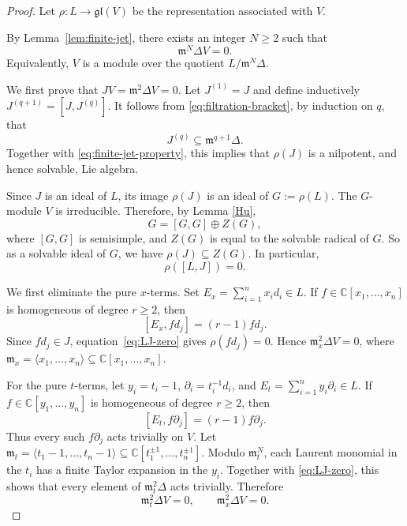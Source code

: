 \documentclass[10pt,a4paper]{amsart}
\newcommand{\C}{\mathbb C}
\def\mm{\mathfrak{m}}
\begin{document}
\begin{proof}
Let
\(
\rho\colon L\rightarrow\mathfrak{gl}(V)
\)
be the representation associated with \(V\).

By Lemma~\ref{lem:finite-jet}, there exists an integer \(N\geq2\)
such that
\begin{equation}\label{eq:finite-jet-property}
\mathfrak m^N\Delta V=0.
\end{equation}
Equivalently,  \(V\) is a module over the  quotient $
L/\mathfrak m^N\Delta$.


We first prove that
$
JV=\mathfrak m^2\Delta V=0$.
Let \(J^{(1)}=J\) and define inductively $
J^{(q+1)}=[J,J^{(q)}]$.
It follows from \eqref{eq:filtration-bracket}, by induction on \(q\),
that
\[
J^{(q)}\subseteq\mathfrak m^{q+1}\Delta.
\]
Together with \eqref{eq:finite-jet-property}, this implies that
\(\rho(J)\) is a nilpotent, and hence solvable, Lie algebra.

Since \(J\) is an ideal of \(L\), its image \(\rho(J)\) is an ideal
of $
G:=\rho(L)$.
The \(G\)-module \(V\) is irreducible. Therefore, by Lemma \ref{Hu},
\[
G=[G,G]\oplus Z(G),
\]
where \([G,G]\) is semisimple, and $Z(G)$ is equal to
the solvable radical of $G$. So as a  solvable ideal of $G$, we have
$\rho(J)\subseteq Z(G)$.
In particular,
\begin{equation}\label{eq:LJ-zero}
\rho([L,J])=0.
\end{equation}



We first eliminate the pure \(x\)-terms. Set
$ E_x=\sum_{i=1}^n x_id_i\in L$.
If $f\in\C[x_1,\ldots,x_n]$ is homogeneous of degree \(r\geq2\),
then
\[
[E_x,fd_j]=(r-1)fd_j.
\]
Since \(fd_j\in J\), equation~\eqref{eq:LJ-zero} gives
\(\rho(fd_j)=0\). Hence \(\mathfrak m_x^2\Delta V=0\), where
 $\mm_x
 =
 \langle x_1,\ldots,x_n\rangle
 \subseteq
 \mathbb C[x_1,\ldots,x_n]$.

For the pure \(t\)-terms, let \(y_i=t_i-1\),
\(\partial_i=t_i^{-1}d_i\), and
$E_t=\sum_{i=1}^n y_i\partial_i\in L$.
If \(f\in\C[y_1,\ldots,y_n]\) is homogeneous of degree \(r\geq2\),
then
\[
[E_t,f\partial_j]=(r-1)f\partial_j.
\]
Thus every such \(f\partial_j\) acts trivially on $V$. Let $
\mathfrak m_t
 =
 \langle t_1-1,\ldots,t_n-1\rangle
 \subseteq
 \mathbb C[t_1^{\pm1},\ldots,t_n^{\pm1}]
$. Modulo
\(\mathfrak m_t^N\), each Laurent monomial in the \(t_i\) has a
finite Taylor expansion in the \(y_i\). Together with
\eqref{eq:LJ-zero}, this shows that every element of
\(\mathfrak m_t^2\Delta\) acts trivially. Therefore
\begin{equation}\label{eq:pure-terms-zero}
\mathfrak m_t^2\Delta V=0,
\qquad
\mathfrak m_x^2\Delta V=0.
\end{equation}


\end{proof}
\end{document}
